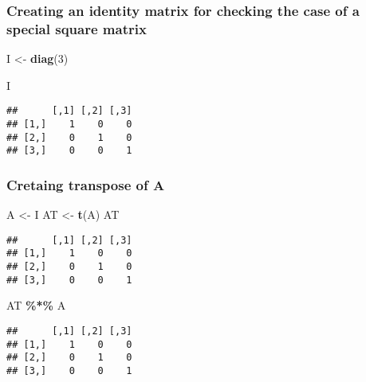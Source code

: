 \documentclass[
]{article}
\newenvironment{Shaded}{\begin{snugshade}}{\end{snugshade}}
\newcommand{\DecValTok}[1]{\textcolor[rgb]{0.00,0.00,0.81}{#1}}
\newcommand{\FunctionTok}[1]{\textcolor[rgb]{0.13,0.29,0.53}{\textbf{#1}}}
\newcommand{\NormalTok}[1]{#1}
\newcommand{\OtherTok}[1]{\textcolor[rgb]{0.56,0.35,0.01}{#1}}
\newcommand{\SpecialCharTok}[1]{\textcolor[rgb]{0.81,0.36,0.00}{\textbf{#1}}}
\begin{document}
\hypertarget{creating-an-identity-matrix-for-checking-the-case-of-a-special-square-matrix}{%
\subsubsection{Creating an identity matrix for checking the case of a
special square
matrix}\label{creating-an-identity-matrix-for-checking-the-case-of-a-special-square-matrix}}

\begin{Shaded}
\begin{Highlighting}[]
\NormalTok{I }\OtherTok{\textless{}{-}} \FunctionTok{diag}\NormalTok{(}\DecValTok{3}\NormalTok{)}

\NormalTok{I}
\end{Highlighting}
\end{Shaded}

\begin{verbatim}
##      [,1] [,2] [,3]
## [1,]    1    0    0
## [2,]    0    1    0
## [3,]    0    0    1
\end{verbatim}

\hypertarget{cretaing-transpose-of-a}{%
\subsubsection{Cretaing transpose of A}\label{cretaing-transpose-of-a}}

\begin{Shaded}
\begin{Highlighting}[]
\NormalTok{A }\OtherTok{\textless{}{-}}\NormalTok{ I}
\NormalTok{AT }\OtherTok{\textless{}{-}} \FunctionTok{t}\NormalTok{(A)}
\NormalTok{AT}
\end{Highlighting}
\end{Shaded}

\begin{verbatim}
##      [,1] [,2] [,3]
## [1,]    1    0    0
## [2,]    0    1    0
## [3,]    0    0    1
\end{verbatim}

\begin{Shaded}
\begin{Highlighting}[]
\NormalTok{AT }\SpecialCharTok{\%*\%}\NormalTok{ A }
\end{Highlighting}
\end{Shaded}

\begin{verbatim}
##      [,1] [,2] [,3]
## [1,]    1    0    0
## [2,]    0    1    0
## [3,]    0    0    1
\end{verbatim}
\end{document}
